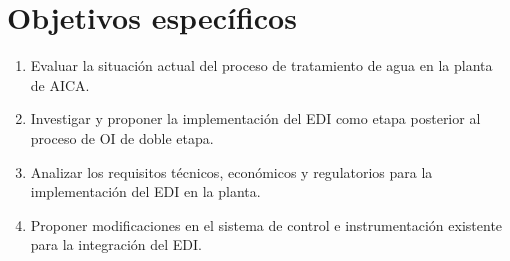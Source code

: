\section{Objetivos específicos}
\begin{enumerate}
    \item Evaluar la situación actual del proceso de tratamiento de agua en la planta de AICA.
    \item Investigar y proponer la implementación del EDI como etapa posterior al proceso de OI de doble etapa.
    \item Analizar los requisitos técnicos, económicos y regulatorios para la implementación del EDI en la planta.
    \item Proponer modificaciones en el sistema de control e instrumentación existente para la integración del EDI.
\end{enumerate}